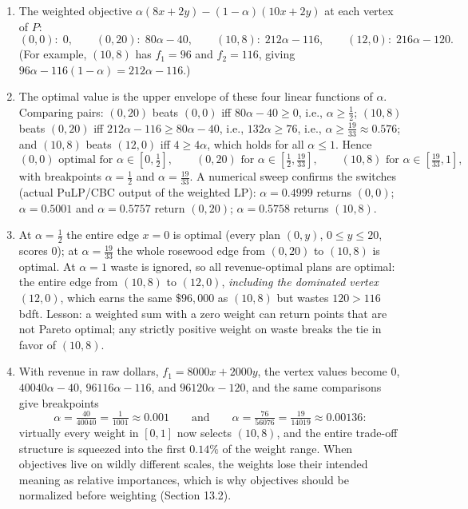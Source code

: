 \begin{enumerate}
\item The weighted objective
$\alpha(8x + 2y) - (1-\alpha)(10x + 2y)$ at each vertex of $P$:
\[
(0,0): \; 0, \qquad
(0,20): \; 80\alpha - 40, \qquad
(10,8): \; 212\alpha - 116, \qquad
(12,0): \; 216\alpha - 120.
\]
(For example, $(10,8)$ has $f_1 = 96$ and $f_2 = 116$, giving
$96\alpha - 116(1 - \alpha) = 212\alpha - 116$.)
\item The optimal value is the upper envelope of these four linear functions
of $\alpha$. Comparing pairs: $(0,20)$ beats $(0,0)$ iff
$80\alpha - 40 \geq 0$, i.e., $\alpha \geq \tfrac12$; $(10,8)$ beats
$(0,20)$ iff $212\alpha - 116 \geq 80\alpha - 40$, i.e., $132\alpha \geq
76$, i.e., $\alpha \geq \tfrac{19}{33} \approx 0.576$; and $(10,8)$ beats
$(12,0)$ iff $4 \geq 4\alpha$, which holds for all $\alpha \leq 1$. Hence
\[
(0,0) \text{ optimal for } \alpha \in [0, \tfrac12], \qquad
(0,20) \text{ for } \alpha \in [\tfrac12, \tfrac{19}{33}], \qquad
(10,8) \text{ for } \alpha \in [\tfrac{19}{33}, 1],
\]
with breakpoints $\alpha = \tfrac12$ and $\alpha = \tfrac{19}{33}$.
A numerical sweep confirms the switches (actual PuLP/CBC output of the
weighted LP): $\alpha = 0.4999$ returns $(0,0)$; $\alpha = 0.5001$ and
$\alpha = 0.5757$ return $(0,20)$; $\alpha = 0.5758$ returns $(10,8)$.
\item At $\alpha = \tfrac12$ the entire edge $x = 0$ is optimal (every plan
$(0, y)$, $0 \leq y \leq 20$, scores $0$); at $\alpha = \tfrac{19}{33}$ the
whole rosewood edge from $(0,20)$ to $(10,8)$ is optimal. At $\alpha = 1$
waste is ignored, so all revenue-optimal plans are optimal: the entire edge
from $(10,8)$ to $(12,0)$, \emph{including the dominated vertex} $(12,0)$,
which earns the same $\$96{,}000$ as $(10,8)$ but wastes $120 > 116$ bdft.
Lesson: a weighted sum with a zero weight can return points that are not
Pareto optimal; any strictly positive weight on waste breaks the tie in
favor of $(10,8)$.
\item With revenue in raw dollars, $f_1 = 8000x + 2000y$, the vertex values
become $0$, $40040\alpha - 40$, $96116\alpha - 116$, and $96120\alpha -
120$, and the same comparisons give breakpoints
\[
\alpha = \tfrac{40}{40040} = \tfrac{1}{1001} \approx 0.001
\qquad\text{and}\qquad
\alpha = \tfrac{76}{56076} = \tfrac{19}{14019} \approx 0.00136 :
\]
virtually every weight in $[0,1]$ now selects $(10,8)$, and the entire
trade-off structure is squeezed into the first $0.14\%$ of the weight range.
When objectives live on wildly different scales, the weights lose their
intended meaning as relative importances, which is why objectives should be
normalized before weighting (Section 13.2).
\end{enumerate}
